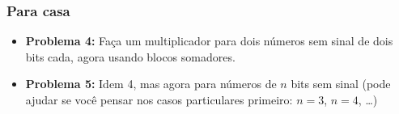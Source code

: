 \documentclass{beamer}
\newcommand{\comment}[1]{{\color{structure.fg!70!white}\footnotesize #1}}
\begin{document}

\begin{frame}
\frametitle{Para casa}

\begin{itemize}
\item \textbf{Problema 4:} Faça um multiplicador para dois números
sem sinal de dois bits cada, agora usando blocos somadores.\\[12pt]
\pause
\item \textbf{Problema 5:} Idem 4, mas agora para números de $n$ bits
sem sinal
\comment{(pode ajudar se você pensar nos casos particulares primeiro:
$n=3$, $n=4$, \ldots)}
\end{itemize}
\end{frame}

\end{document}
